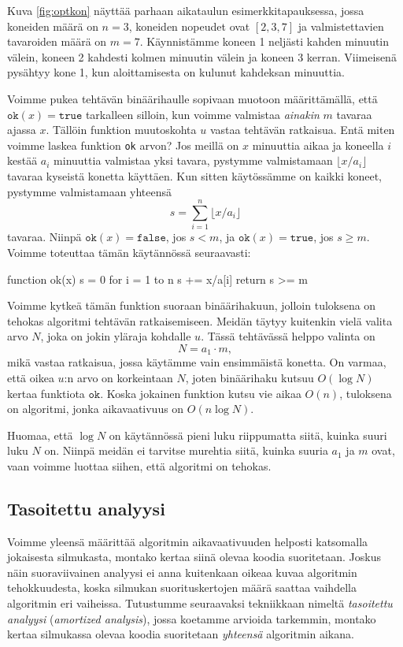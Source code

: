 Kuva \ref{fig:optkon} näyttää parhaan aikataulun esimerkkitapauksessa,
jossa koneiden määrä on $n=3$, koneiden nopeudet ovat $[2,3,7]$ ja
valmistettavien tavaroiden määrä on $m=7$.
Käynnistämme koneen 1 neljästi kahden minuutin välein,
koneen 2 kahdesti kolmen minuutin välein ja koneen 3 kerran.
Viimeisenä pysähtyy kone 1, kun aloittamisesta
on kulunut kahdeksan minuuttia.

Voimme pukea tehtävän binäärihaulle sopivaan muotoon määrittämällä,
että $\texttt{ok}(x)=\texttt{true}$ tarkalleen silloin, kun voimme valmistaa
\emph{ainakin} $m$ tavaraa ajassa $x$.
Tällöin funktion muutoskohta $u$ vastaa tehtävän ratkaisua.
Entä miten voimme laskea funktion \texttt{ok} arvon?
Jos meillä on $x$ minuuttia aikaa ja koneella $i$ kestää $a_i$
minuuttia valmistaa yksi tavara, pystymme valmistamaan
$\lfloor x/a_i \rfloor$ tavaraa kyseistä konetta käyttäen.
Kun sitten käytössämme on kaikki koneet,
pystymme valmistamaan yhteensä
\[ s = \sum_{i=1}^n \lfloor x/a_i \rfloor \]
tavaraa. Niinpä $\texttt{ok}(x)=\texttt{false}$, jos $s<m$,
ja $\texttt{ok}(x)=\texttt{true}$, jos $s \ge m$.
Voimme toteuttaa tämän käytännössä seuraavasti:

\begin{code}
function ok(x)
    s = 0
    for i = 1 to n
        s += x/a[i]
    return s >= m
\end{code}

Voimme kytkeä tämän funktion suoraan binäärihakuun,
jolloin tuloksena on tehokas algoritmi tehtävän ratkaisemiseen.
Meidän täytyy kuitenkin vielä valita arvo $N$,
joka on jokin yläraja kohdalle $u$.
Tässä tehtävässä helppo valinta on
\[N = a_1 \cdot m,\]
mikä vastaa ratkaisua, jossa käytämme vain ensimmäistä konetta.
On varmaa, että oikea $u$:n arvo on korkeintaan $N$,
joten binäärihaku kutsuu $O(\log N)$ kertaa funktiota $\texttt{ok}$.
Koska jokainen funktion kutsu vie aikaa $O(n)$,
tuloksena on algoritmi, jonka aikavaativuus on $O(n \log N)$.

Huomaa, että $\log N$ on käytännössä pieni luku riippumatta
siitä, kuinka suuri luku $N$ on.
Niinpä meidän ei tarvitse murehtia siitä,
kuinka suuria $a_1$ ja $m$ ovat,
vaan voimme luottaa siihen, että algoritmi on tehokas.

\subsection{Tasoitettu analyysi}


Voimme yleensä määrittää algoritmin aikavaativuuden
helposti katsomalla jokaisesta silmukasta,
montako kertaa siinä olevaa koodia suoritetaan.
Joskus näin suoraviivainen analyysi ei anna kuitenkaan
oikeaa kuvaa algoritmin tehokkuudesta,
koska silmukan suorituskertojen määrä saattaa vaihdella
algoritmin eri vaiheissa.
Tutustumme seuraavaksi tekniikkaan nimeltä
\emph{tasoitettu analyysi} (\emph{amortized analysis}),
jossa koetamme arvioida tarkemmin,
montako kertaa silmukassa olevaa koodia suoritetaan
\emph{yhteensä} algoritmin aikana.

